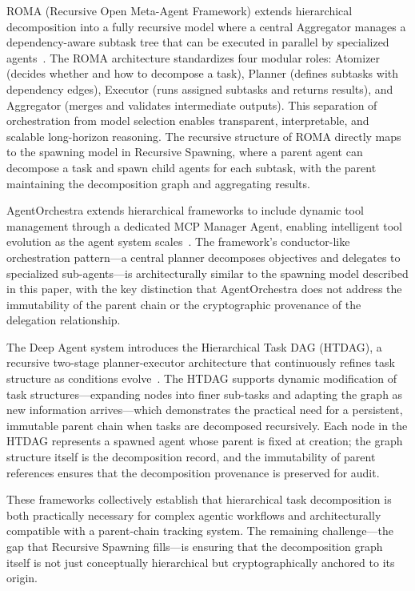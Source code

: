 ROMA (Recursive Open Meta-Agent Framework) extends hierarchical decomposition into a fully recursive model where a central Aggregator manages a dependency-aware subtask tree that can be executed in parallel by specialized agents~\cite{roma_2026}. The ROMA architecture standardizes four modular roles: Atomizer (decides whether and how to decompose a task), Planner (defines subtasks with dependency edges), Executor (runs assigned subtasks and returns results), and Aggregator (merges and validates intermediate outputs). This separation of orchestration from model selection enables transparent, interpretable, and scalable long-horizon reasoning. The recursive structure of ROMA directly maps to the spawning model in Recursive Spawning, where a parent agent can decompose a task and spawn child agents for each subtask, with the parent maintaining the decomposition graph and aggregating results.

AgentOrchestra extends hierarchical frameworks to include dynamic tool management through a dedicated MCP Manager Agent, enabling intelligent tool evolution as the agent system scales~\cite{agentorchestra_2025}. The framework's conductor-like orchestration pattern—a central planner decomposes objectives and delegates to specialized sub-agents—is architecturally similar to the spawning model described in this paper, with the key distinction that AgentOrchestra does not address the immutability of the parent chain or the cryptographic provenance of the delegation relationship.

The Deep Agent system introduces the Hierarchical Task DAG (HTDAG), a recursive two-stage planner-executor architecture that continuously refines task structure as conditions evolve~\cite{deep_agent_2024}. The HTDAG supports dynamic modification of task structures—expanding nodes into finer sub-tasks and adapting the graph as new information arrives—which demonstrates the practical need for a persistent, immutable parent chain when tasks are decomposed recursively. Each node in the HTDAG represents a spawned agent whose parent is fixed at creation; the graph structure itself is the decomposition record, and the immutability of parent references ensures that the decomposition provenance is preserved for audit.

These frameworks collectively establish that hierarchical task decomposition is both practically necessary for complex agentic workflows and architecturally compatible with a parent-chain tracking system. The remaining challenge—the gap that Recursive Spawning fills—is ensuring that the decomposition graph itself is not just conceptually hierarchical but cryptographically anchored to its origin.

